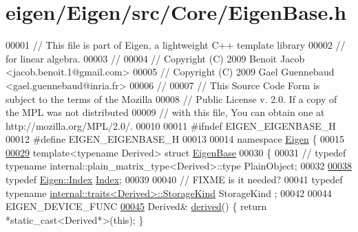 \hypertarget{eigen_2_eigen_2src_2_core_2_eigen_base_8h_source}{}\section{eigen/\+Eigen/src/\+Core/\+Eigen\+Base.h}
\label{eigen_2_eigen_2src_2_core_2_eigen_base_8h_source}

\begin{DoxyCode}
00001 \textcolor{comment}{// This file is part of Eigen, a lightweight C++ template library}
00002 \textcolor{comment}{// for linear algebra.}
00003 \textcolor{comment}{//}
00004 \textcolor{comment}{// Copyright (C) 2009 Benoit Jacob <jacob.benoit.1@gmail.com>}
00005 \textcolor{comment}{// Copyright (C) 2009 Gael Guennebaud <gael.guennebaud@inria.fr>}
00006 \textcolor{comment}{//}
00007 \textcolor{comment}{// This Source Code Form is subject to the terms of the Mozilla}
00008 \textcolor{comment}{// Public License v. 2.0. If a copy of the MPL was not distributed}
00009 \textcolor{comment}{// with this file, You can obtain one at http://mozilla.org/MPL/2.0/.}
00010 
00011 \textcolor{preprocessor}{#ifndef EIGEN\_EIGENBASE\_H}
00012 \textcolor{preprocessor}{#define EIGEN\_EIGENBASE\_H}
00013 
00014 \textcolor{keyword}{namespace }\hyperlink{namespace_eigen}{Eigen} \{
00015 
\hyperlink{group___core___module}{00029} \textcolor{keyword}{template}<\textcolor{keyword}{typename} Derived> \textcolor{keyword}{struct }\hyperlink{group___core___module_struct_eigen_1_1_eigen_base}{EigenBase}
00030 \{
00031 \textcolor{comment}{//   typedef typename internal::plain\_matrix\_type<Derived>::type PlainObject;}
00032   
\hyperlink{group___core___module_a554f30542cc2316add4b1ea0a492ff02}{00038}   \textcolor{keyword}{typedef} \hyperlink{namespace_eigen_a62e77e0933482dafde8fe197d9a2cfde}{Eigen::Index} \hyperlink{group___core___module_a554f30542cc2316add4b1ea0a492ff02}{Index};
00039 
00040   \textcolor{comment}{// FIXME is it needed?}
00041   \textcolor{keyword}{typedef} \textcolor{keyword}{typename} \hyperlink{struct_eigen_1_1internal_1_1traits}{internal::traits<Derived>::StorageKind} StorageKind
      ;
00042 
00044   EIGEN\_DEVICE\_FUNC
\hyperlink{group___core___module_a324b16961a11d2ecfd2d1b7dd7946545}{00045}   Derived& \hyperlink{group___core___module_a324b16961a11d2ecfd2d1b7dd7946545}{derived}() \{ \textcolor{keywordflow}{return} *\textcolor{keyword}{static\_cast<}Derived*\textcolor{keyword}{>}(\textcolor{keyword}{this}); \}

\end{DoxyCode}
